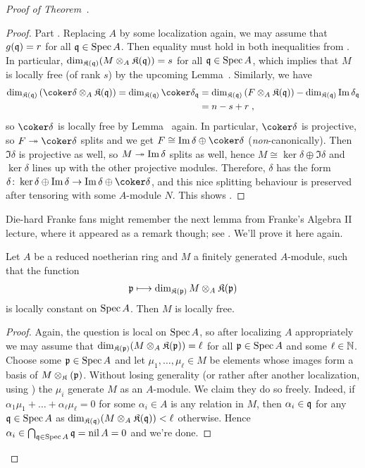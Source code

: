 \documentclass[a4paper,parskip=half,numbers=enddot, DIV=12]{scrreprt}
\begin{document}
\begin{proof}[Proof of Theorem~]
\begin{proof}
		Part . Replacing $A$ by some localization again, we may assume that $g(\mathfrak{q})=r$ for all $\mathfrak{q}\in\operatorname{Spec} A$. Then equality must hold in both inequalities from . In particular, $\dim_{\mathfrak{K}(\mathfrak{q})}(M\otimes_A\mathfrak{K}(\mathfrak{q}))=s$ for all $\mathfrak{q}\in\operatorname{Spec} A$, which implies that $M$ is locally free (of rank $s$) by the upcoming Lemma~. Similarly, we have
		\begin{align*}
			\dim_{\KK(\qq)}\left(\coker\delta\otimes_A\KK(\qq)\right)=\dim_{\KK(\qq)}\coker\delta_\qq&=\dim_{\KK(\qq)}\left(F\otimes_A\KK(\qq)\right)-\dim_{\KK(\qq)}\Im\delta_\qq\\
			&=n-s+r\;,
		\end{align*}
		so $\coker\delta$ is locally free by Lemma~ again. In particular, $\coker\delta$ is projective, so $F\epimorphism\coker\delta$ splits and we get $F\cong \Im\delta\oplus\coker\delta$ (\emph{non}-canonically). Then $\Im\delta$ is projective as well, so $M\epimorphism\Im\delta$ splits as well, hence $M\cong \ker\delta\oplus\Im\delta$ and $\ker\delta$ lines up with the other projective modules. Therefore, $\delta$ has the form $\delta\colon \ker\delta\oplus\Im\delta\morphism\Im\delta\oplus\coker\delta$, and this nice splitting behaviour is preserved after tensoring with some $A$-module $N$. This shows .
	\end{proof}
	Die-hard Franke fans might remember the next lemma from Franke's Algebra II lecture, where it appeared as a remark though; see \cite[25]{alg2}. We'll prove it here again.
	\begin{lem}
		Let $A$ be a reduced noetherian ring and $M$ a finitely generated $A$-module, such that the function
		\begin{align*}
			\mathfrak{p}\longmapsto \dim_{\mathfrak{K}(\mathfrak{p})}M\otimes_A\mathfrak{K}(\mathfrak{p})
		\end{align*}
		is locally constant on $\operatorname{Spec} A$. Then $M$ is locally free.
	\end{lem}
	\begin{proof}
		Again, the question is local on $\operatorname{Spec} A$, so after localizing $A$ appropriately we may assume that $\dim_{\mathfrak{K}(\mathfrak{p})}(M\otimes_A\mathfrak{K}(\mathfrak{p}))=\ell$ for all $\mathfrak{p}\in\operatorname{Spec} A$ and some $\ell\in\mathbb{N}$. Choose some $\mathfrak{p}\in\operatorname{Spec} A$ and let $\mu_1,\ldots,\mu_\ell\in M$ be elements whose images form a basis of $M\otimes_{\mathfrak{K}}(\mathfrak{p})$. Without losing generality (or rather after another localization, using \cite[Lemma~1.5.1]{alg2}) the $\mu_i$ generate $M$ as an $A$-module. We claim they do so freely. Indeed, if $\alpha_1\mu_1+\ldots+\alpha_\ell\mu_\ell=0$ for some $\alpha_i\in A$ is any relation in $M$, then $\alpha_i\in\mathfrak{q}$ for any $\mathfrak{q}\in\operatorname{Spec} A$ as $\dim_{\mathfrak{K}(\mathfrak{q})}(M\otimes_A\mathfrak{K}(\mathfrak{q}))<\ell$ otherwise. Hence $\alpha_i\in\bigcap_{\mathfrak{q}\in\operatorname{Spec} A}\mathfrak{q}=\operatorname{nil} A=0$ and we're done.

\end{proof}
\end{proof}
\end{document}
